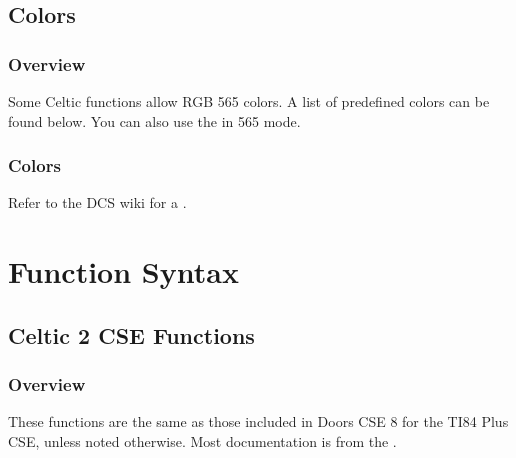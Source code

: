 \documentclass[letterpaper,10pt,english]{sphinxmanual}
\begin{document}
\sphinxstepscope


\section{Colors}
\label{\detokenize{colors:colors}}\label{\detokenize{colors::doc}}

\subsection{Overview}
\label{\detokenize{colors:overview}}
\sphinxAtStartPar
Some Celtic functions allow RGB 565 colors. A list of pre\sphinxhyphen{}defined colors can be found below. You can also use the  in 565 mode.


\subsection{Colors}
\label{\detokenize{colors:id1}}
\sphinxAtStartPar
Refer to the DCS wiki for a .

\chapter{Function Syntax}

\sphinxstepscope


\section{Celtic 2 CSE Functions}
\label{\detokenize{csefunctions:celtic-2-cse-functions}}\label{\detokenize{csefunctions::doc}}

\subsection{Overview}
\label{\detokenize{csefunctions:overview}}
\sphinxAtStartPar
These functions are the same as those included in Doors CSE 8 for the TI\sphinxhyphen{}84 Plus CSE, unless noted otherwise. Most documentation is from the .
\end{document}
